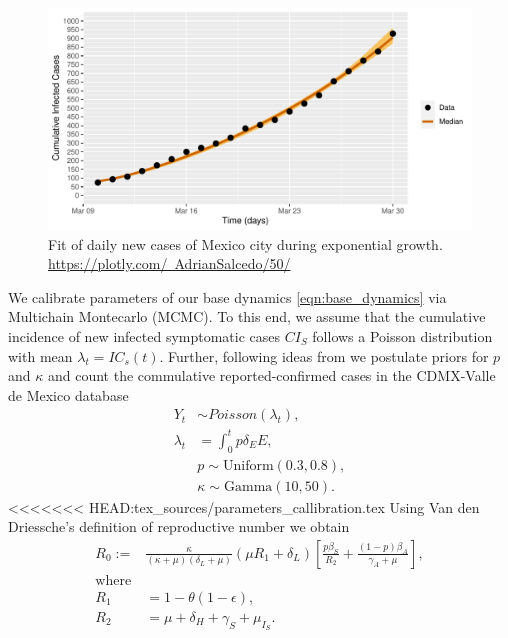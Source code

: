 \begin{figure}[htb]
    \centering
    \includegraphics[scale=0.7, keepaspectratio]{./cdmx_CIs_data_begining_fit}
    \caption{%
        Fit of daily new cases of Mexico city
        during exponential growth.
        \href{https://plotly.com/~AdrianSalcedo/50/}{%
		 https://plotly.com/~AdrianSalcedo/50/}
    }
    \label{fig:data_CDMX_fitting}
\end{figure}
%
We calibrate parameters of our base dynamics
\eqref{eqn:base_dynamics} via Multichain Montecarlo (MCMC).
To this end, we assume that the cumulative
incidence of new infected symptomatic cases $CI_S$
follows a Poisson distribution with mean $\lambda_t = IC_s(t)$. Further,
following ideas from \cite{Acuna2020} we postulate priors for $p$ and $\kappa$
and count the commulative reported-confirmed cases in the CDMX-Valle de Mexico
database \cite{cdmxDATA}
\begin{equation}
    \label{eqn:boservation_model}
    \begin{aligned}
        Y_t & \sim Poisson(\lambda_t),
        \\
        \lambda_t
        &=
        \int_{0}^t p \delta_E E ,
        \\
        & p \sim \text{Uniform} (0.3, 0.8),
        \\
        & \kappa \sim \text{Gamma}(10, 50).
    \end{aligned}
\end{equation}
%
<<<<<<< HEAD:tex_sources/parameters_callibration.tex
Using Van den Driessche's \cite{Van2002} definition of reproductive number
we obtain
\begin{equation*}
    \label{eqn:reproductive_number}
    \begin{aligned}
        R_0 :=
        &
        \frac{\kappa}{(\kappa + \mu)(\delta_L + \mu)}
        \left(
            \mu R_1 + \delta_L
        \right)
        \left[
            \frac{p\beta_S}{R_2}
            +\frac{(1 - p) \beta_A}{\gamma_A+\mu}
        \right],
    \\
    \text{where} &
    \\
        R_1 &= 1 - \theta(1 - \epsilon),
    \\
        R_2 &= \mu + \delta_H + \gamma_S + \mu_{I_{S}}.
    \end{aligned}
\end{equation*}
